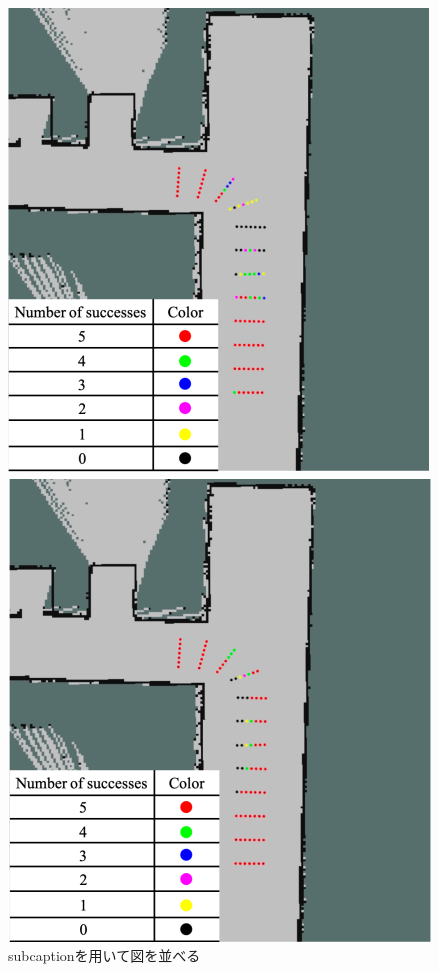 \documentclass{jarticle}
\begin{document}
\begin{figure}[htbp]
  \begin{minipage}[t]{0.5\linewidth}
    \centering
    \includegraphics[keepaspectratio, scale=0.24]{figs/a.png}
  \end{minipage}
  \begin{minipage}[t]{0.5\linewidth}
    \centering
    \includegraphics[keepaspectratio, scale=0.24]{figs/b.png}
  \end{minipage}\vspace*{2mm}
  \caption{subcaptionを用いて図を並べる}
\end{figure}
\end{document}
